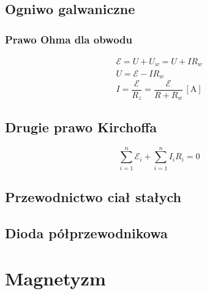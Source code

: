 \documentclass{article}
\numberwithin{equation}{section}
\newcommand{\unit}[1]{\, \left[\mathrm{#1}\right]}
\begin{document}
    \subsection{Ogniwo galwaniczne}
      \subsubsection{Prawo Ohma dla obwodu}
        \begin{gather}
          \mathcal E = U + U_w = U + IR_w\\
          U = \mathcal E - IR_w
        \end{gather}
        \begin{equation}
          I = \frac{\mathcal E}{R_z} = \frac{\mathcal E}{R + R_w} \unit{A}
        \end{equation}
    \subsection{Drugie prawo Kirchoffa}
      \begin{equation}
        \sum_{i=1}^n \mathcal E_i + \sum_{i=1}^n I_iR_i = 0
      \end{equation}
    \subsection{Przewodnictwo ciał stałych}
    \subsection{Dioda półprzewodnikowa}

  \newpage
  \section{Magnetyzm}
\end{document}
